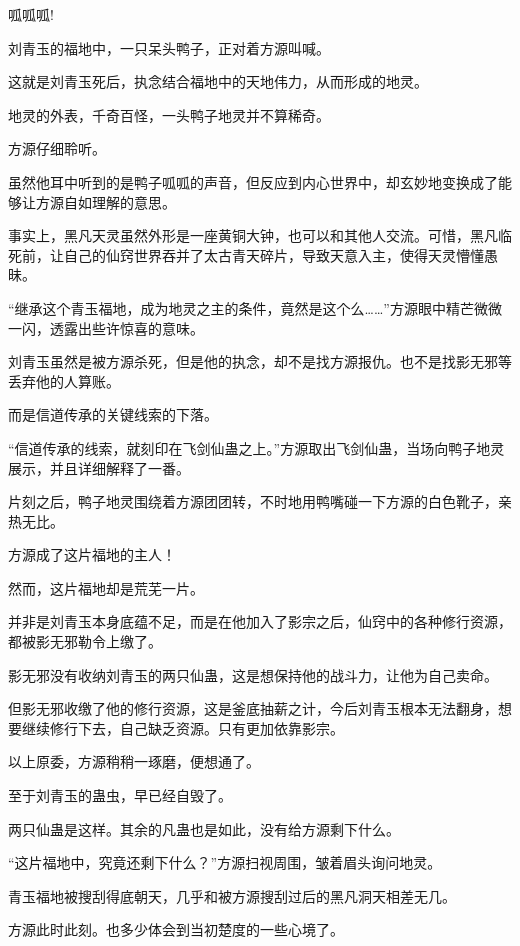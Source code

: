 
\begin{this_body}

呱呱呱!

刘青玉的福地中，一只呆头鸭子，正对着方源叫喊。

这就是刘青玉死后，执念结合福地中的天地伟力，从而形成的地灵。

地灵的外表，千奇百怪，一头鸭子地灵并不算稀奇。

方源仔细聆听。

虽然他耳中听到的是鸭子呱呱的声音，但反应到内心世界中，却玄妙地变换成了能够让方源自如理解的意思。

事实上，黑凡天灵虽然外形是一座黄铜大钟，也可以和其他人交流。可惜，黑凡临死前，让自己的仙窍世界吞并了太古青天碎片，导致天意入主，使得天灵懵懂愚昧。

“继承这个青玉福地，成为地灵之主的条件，竟然是这个么……”方源眼中精芒微微一闪，透露出些许惊喜的意味。

刘青玉虽然是被方源杀死，但是他的执念，却不是找方源报仇。也不是找影无邪等丢弃他的人算账。

而是信道传承的关键线索的下落。

“信道传承的线索，就刻印在飞剑仙蛊之上。”方源取出飞剑仙蛊，当场向鸭子地灵展示，并且详细解释了一番。

片刻之后，鸭子地灵围绕着方源团团转，不时地用鸭嘴碰一下方源的白色靴子，亲热无比。

方源成了这片福地的主人！

然而，这片福地却是荒芜一片。

并非是刘青玉本身底蕴不足，而是在他加入了影宗之后，仙窍中的各种修行资源，都被影无邪勒令上缴了。

影无邪没有收纳刘青玉的两只仙蛊，这是想保持他的战斗力，让他为自己卖命。

但影无邪收缴了他的修行资源，这是釜底抽薪之计，今后刘青玉根本无法翻身，想要继续修行下去，自己缺乏资源。只有更加依靠影宗。

以上原委，方源稍稍一琢磨，便想通了。

至于刘青玉的蛊虫，早已经自毁了。

两只仙蛊是这样。其余的凡蛊也是如此，没有给方源剩下什么。

“这片福地中，究竟还剩下什么？”方源扫视周围，皱着眉头询问地灵。

青玉福地被搜刮得底朝天，几乎和被方源搜刮过后的黑凡洞天相差无几。

方源此时此刻。也多少体会到当初楚度的一些心境了。


\end{this_body}
